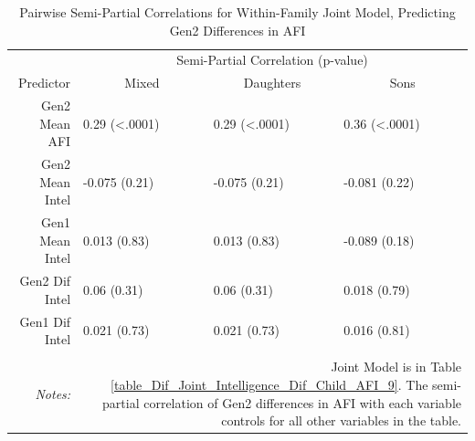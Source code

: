 \documentclass[a4paper,man,apacite,natbib,12pt,longtable]{apa6}\usepackage[]{graphicx}\usepackage[]{color}
\begin{document}
\noindent\begin{minipage}{\textwidth}
\begin{longtable}{@{\extracolsep{5pt}}rlll} \caption{\small Pairwise Semi-Partial Correlations for Within-Family Joint Model, Predicting Gen2 Differences in AFI}\label{table_spcor_wtn}
\hline
&   \multicolumn{3}{c}{Semi-Partial Correlation (p-value)}\\
Predictor &  \multicolumn{1}{c}{Mixed} & \multicolumn{1}{c}{Daughters} & \multicolumn{1}{c}{Sons}\\	
\hline 
Gen2 Mean AFI & 0.29 (<.0001) & 0.29 (<.0001)& 0.36 (<.0001)\\ 
Gen2 Mean Intel & -0.075 (0.21) & -0.075 (0.21)& -0.081 (0.22)\\
Gen1 Mean Intel & 0.013 (0.83) & 0.013 (0.83)& -0.089 (0.18)\\ 
Gen2 Dif Intel & 0.06 (0.31) & 0.06 (0.31)& 0.018 (0.79)\\ 
Gen1 Dif Intel & 0.021 (0.73) & 0.021 (0.73)& 0.016 (0.81)\\ 
\hline\\
\textit{Notes:}  & \multicolumn{3}{r}{\parbox{.6\linewidth}{\footnotesize Joint Model is in Table \ref{table_Dif_Joint_Intelligence_Dif_Child_AFI_9}. The semi-partial correlation of Gen2 differences in AFI with each variable controls for all other variables in the table.}} \\ 
\end{longtable}\end{minipage}\\
\end{document}
